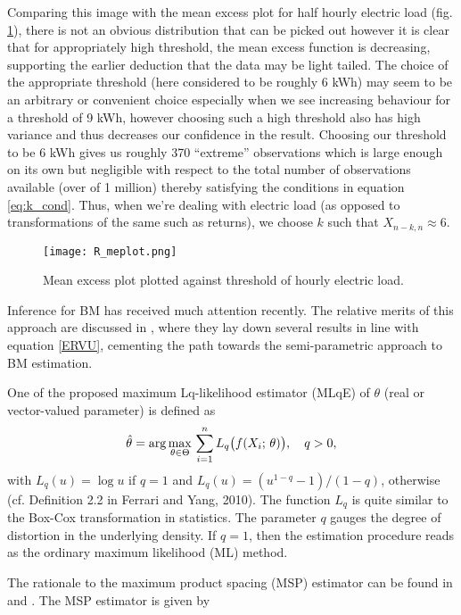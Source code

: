 Comparing this image with the mean excess plot for half hourly electric load  (fig. \ref{fig:r_me}), there is not an obvious distribution that can be picked out however it is clear that for appropriately high threshold, the mean excess function is decreasing, supporting the earlier deduction that the data may be light tailed. The choice of the appropriate threshold (here considered to be roughly 6 kWh) may seem to be an arbitrary or convenient choice especially when we see increasing behaviour for a threshold of 9 kWh, however choosing such a high threshold also has high variance and thus decreases our confidence in the result. Choosing our threshold to be 6 kWh gives us roughly 370 ``extreme'' observations which is large enough on its own but negligible with respect to the total number of observations available (over of 1 million) thereby satisfying the conditions in equation \ref{eq:k_cond}. Thus, when we're dealing with electric load (as opposed to transformations of the same such as returns), we choose $k$ such that $X_{n-k,n} \approx 6$.

\begin{figure}
\centering
\texttt{[image: R\_meplot.png]}
\caption{\label{fig:r_me} Mean excess plot plotted against threshold of hourly electric load.}
\end{figure}


Inference for BM has received much attention recently. The relative merits of this approach are discussed in \cite{FdeH:15}, where they lay down several results in line with equation \ref{ERVU}, cementing the path towards the semi-parametric approach to BM estimation.

One of the proposed maximum Lq-likelihood estimator (MLqE) of $\theta$ (real or vector-valued parameter) is defined as
\begin{equation*}
	\hat{\theta}= \displaystyle {\arg\max_{\theta \in \Theta}} \, \sum\limits_{i=1}^{n} L_q\bigl( f(X_i; \, \theta)\bigr), \quad q>0,
\end{equation*}
with $L_q(u)= \log u$ if $q=1$ and $L_q(u)= (u^{1-q}- 1)/(1-q)$, otherwise (cf. Definition 2.2 in Ferrari and Yang, 2010). The function $L_q$ is quite similar to the Box-Cox transformation in statistics. The parameter $q$ gauges the degree of distortion in the underlying density. If $q=1$, then the estimation procedure reads as the ordinary maximum likelihood (ML) method.

The rationale to the maximum product spacing (MSP) estimator can be found in \cite{ChengAmin:79} and \cite{Ranneby:84}. The MSP estimator is given by

